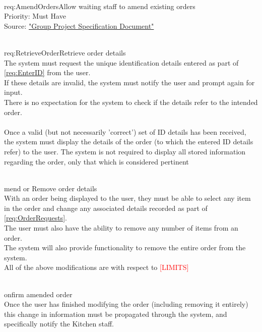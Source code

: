 \documentclass[11pt, a4paper]{report}
\def\itempar#1\\{\item \textbf{#1}\\} %
\begin{document}
\begin{enumerate}[label=F-UR-\arabic*, series=functional]
\itempar \label{req:AmendOrders}Allow waiting staff to amend existing orders\\
Priority: Must Have\\
Source: \href{http://www.macs.hw.ac.uk/~rpp6/teaching/GroupProject/docs/project/GroupProjectSpec2017.pdf}{"Group Project Specification Document"}
\begin{enumerate}[label*=.\arabic*]
\itempar \label{req:RetrieveOrder}Retrieve order details\\
The system must request the unique identification details entered as part of \autoref{req:EnterID} from the user.\\
If these details are invalid, the system must notify the user and prompt again for input.\\
There is no expectation for the system to check if the details refer to the intended order.\\
\\
Once a valid (but not necessarily 'correct') set of ID details has been received, the system must display the details of the order (to which the entered ID details refer) to the user. The system is not required to display all stored information regarding the order, only that which is considered pertinent %

\itempar Amend or Remove order details\\
With an order being displayed to the user, they must be able to select any item in the order and change any associated details recorded as part of \autoref{req:OrderRequests}.\\
The user must also have the ability to remove any number of items from an order.\\
The system will also provide functionality to remove the entire order from the system.\\
All of the above modifications are with respect to %
\textcolor{red}{[LIMITS]}

\itempar Confirm amended order\\
Once the user has finished modifying the order (including removing it entirely) this change in information must be propagated through the system, and specifically notify the Kitchen staff.
\end{enumerate}


\end{enumerate}
\end{document}
